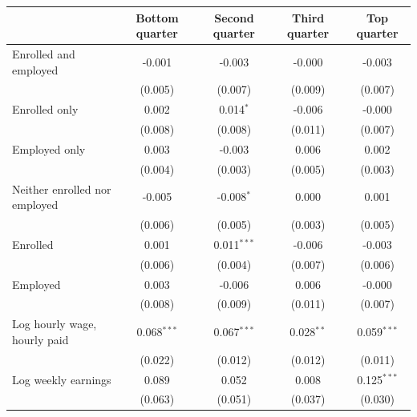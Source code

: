 \begin{tabular}{lcccc}
\toprule
 & Bottom quarter & Second quarter & Third quarter & Top quarter \\
\midrule
Enrolled and employed & -0.001 & -0.003 & -0.000 & -0.003 \\
 & (0.005) & (0.007) & (0.009) & (0.007) \\
Enrolled only & 0.002 & 0.014$^{*}$ & -0.006 & -0.000 \\
 & (0.008) & (0.008) & (0.011) & (0.007) \\
Employed only & 0.003 & -0.003 & 0.006 & 0.002 \\
 & (0.004) & (0.003) & (0.005) & (0.003) \\
Neither enrolled nor employed & -0.005 & -0.008$^{*}$ & 0.000 & 0.001 \\
 & (0.006) & (0.005) & (0.003) & (0.005) \\
Enrolled & 0.001 & 0.011$^{***}$ & -0.006 & -0.003 \\
 & (0.006) & (0.004) & (0.007) & (0.006) \\
Employed & 0.003 & -0.006 & 0.006 & -0.000 \\
 & (0.008) & (0.009) & (0.011) & (0.007) \\
Log hourly wage, hourly paid & 0.068$^{***}$ & 0.067$^{***}$ & 0.028$^{**}$ & 0.059$^{***}$ \\
 & (0.022) & (0.012) & (0.012) & (0.011) \\
Log weekly earnings & 0.089 & 0.052 & 0.008 & 0.125$^{***}$ \\
 & (0.063) & (0.051) & (0.037) & (0.030) \\
\bottomrule
\end{tabular}
